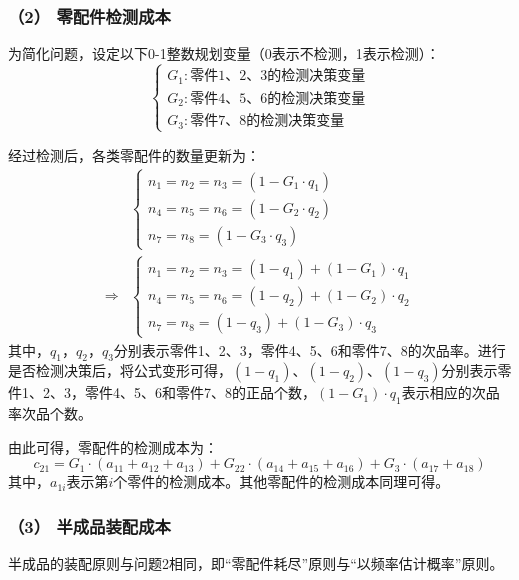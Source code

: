 \documentclass[withoutpreface,bwprint]{cumcmthesis} %
\begin{document}
\subsubsection*{（2） 零配件检测成本}
为简化问题，设定以下0-1整数规划变量（0表示不检测，1表示检测）：
\begin{equation*}
	\left\{\begin{array}{l}
		G_1: \text{零件1、2、3的检测决策变量}\\
		G_2: \text{零件4、5、6的检测决策变量}\\
		G_3:\text{零件7、8的检测决策变量}
	\end{array}\right.
\end{equation*}

经过检测后，各类零配件的数量更新为：
\begin{equation}
	\begin{aligned}
		&\left\{\begin{array}{l}
			n_1=n_2=n_3=\left(1-G_1 \cdot q_1\right) \\
			n_4=n_5=n_6=\left(1-G_2 \cdot q_2\right) \\
			n_7=n_8=\left(1-G_3 \cdot q_3\right)
		\end{array}\right. \\
		 \Rightarrow 
		 & \left\{\begin{array}{l}
			n_1=n_2=n_3=\left(1-q_1\right)+\left(1-G_1\right) \cdot q_1 \\
			n_4=n_5=n_6=\left(1-q_2\right)+\left(1-G_2\right) \cdot q_2 \\
			n_7=n_8=\left(1-q_3\right)+\left(1-G_3\right) \cdot q_3
		\end{array}\right.
	\end{aligned}
\end{equation}
其中，$q_1$，$q_2$，$q_3$分别表示零件1、2、3，零件4、5、6和零件7、8的次品率。进行是否检测决策后，将公式变形可得，$(1-q_1)$、$(1-q_2)$、$(1-q_3)$分别表示零件1、2、3，零件4、5、6和零件7、8的正品个数，$(1-G_1)\cdot q_1$表示相应的次品率次品个数。

由此可得，零配件的检测成本为：
\begin{equation}
	c_{21}=G_1 \cdot\left(a_{11}+a_{12}+a_{13}\right)+G_{22} \cdot\left(a_{14}+a_{15}+a_{16}\right)+G_3 \cdot\left(a_{17}+a_{18}\right)
\end{equation}
其中，$a_{1i}$表示第$i$个零件的检测成本。其他零配件的检测成本同理可得。

\subsubsection*{（3） 半成品装配成本}
半成品的装配原则与问题2相同，即“零配件耗尽”原则与“以频率估计概率”原则。
\end{document}
